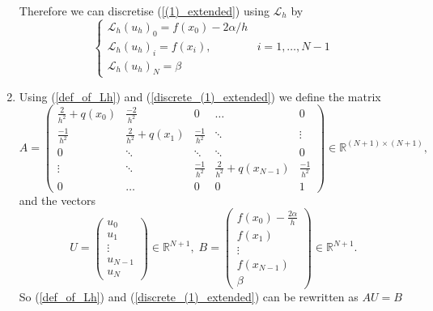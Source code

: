 \documentclass[a4paper,11pt]{article}
\theoremstyle{plain} %
\theoremstyle{definition} %
\theoremstyle{remark} %
\newcommand{\Lc}{\mathcal{L}}
\begin{document}
\begin{enumerate}
Therefore we can discretise (\ref{(1)_extended}) using $\Lc_h$ by
\begin{equation} \label{discrete_(1)_extended}
\begin{cases}
\Lc_h(u_h)_0 = f(x_0) - 2\alpha/h \\
\Lc_h(u_h)_i = f(x_i), & i = 1, \dotsc, N-1 \\
\Lc_h(u_h)_N = \beta 
\end{cases} 
\end{equation}

\item Using (\ref{def_of_Lh}) and (\ref{discrete_(1)_extended}) we define the matrix
\[A = 
\begin{pmatrix}
\frac{2}{h^2}+q(x_0) & \frac{-2}{h^2} & 0& \ldots  & 0 \\
\frac{-1}{h^2} & \frac{2}{h^2} + q(x_1) & \frac{-1}{h^2} & \ddots & \vdots \\
0 & \ddots & \ddots & \ddots & 0 \\ 
\vdots & \ddots & \frac{-1}{h^2} & \frac{2}{h^2} + q(x_{N-1}) & \frac{-1}{h^2} \\
0 & \dots & 0 & 0 & 1
\end{pmatrix} \in \mathbb{R}^{(N+1) \times (N+1)}, 
\]
and the vectors
\[U = 
\begin{pmatrix}
u_0 \\
u_1 \\
\vdots \\
u_{N-1} \\
u_N
\end{pmatrix}\in \mathbb{R}^{N+1}, \;
B = \begin{pmatrix}
f(x_0) - \frac{2\alpha}{h} \\
f(x_1) \\
\vdots \\
f(x_{N-1}) \\
\beta
\end{pmatrix} 
\in \mathbb{R}^{N+1}.
 \]
So (\ref{def_of_Lh}) and (\ref{discrete_(1)_extended}) can be rewritten as $AU = B$


\end{enumerate}
\end{document}
